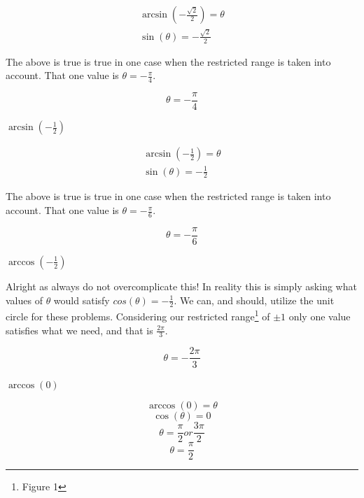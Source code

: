 \documentclass[10pt,letterpaper]{amspset}
\begin{document}
\begin{solution}
    \begin{align}
        \arcsin(-\frac{ \sqrt{2} } {2}) = \theta \\
        \sin(\theta) = -\frac{ \sqrt{2} } {2}
    \end{align}
    
    The above is true is true in one case when the restricted range is taken into account. That one value is $ \theta = -\frac{\pi}{4}$.
    
    \[\boxed{ \theta = -\frac{\pi}{4} }\]
\end{solution}


\begin{problem}[4]
    $\arcsin(-\frac{1}{2})$
\end{problem}

\begin{solution}
    \begin{align}
        \arcsin(-\frac{1}{2}) = \theta \\
        \sin(\theta) = -\frac{1}{2}
    \end{align}
    
    The above is true is true in one case when the restricted range is taken into account. That one value is $ \theta = -\frac{\pi}{6}$.
    
    \[\boxed{ \theta = -\frac{\pi}{6} }\]
\end{solution}

\begin{problem}[13]
    $\arccos(-\frac{1}{2})$
\end{problem}

\begin{solution}
    Alright as always do not overcomplicate this! In reality this is simply asking what values of $\theta$ would satisfy $cos(\theta) = -\frac{1}{2}$. We can, and should, utilize the unit circle for these problems. Considering our restricted range\footnote{Figure 1} of $\pm 1$ only one value satisfies what we need, and that is $\frac{2\pi}{3}$.
    
    \[\boxed{ \theta = -\frac{2\pi}{3} }\]
\end{solution}


\begin{problem}[14]
    $\arccos(0)$
\end{problem}

\begin{solution}
    \[ \arccos(0) = \theta \]
    \[ \cos(\theta) = 0\]
    \[ \theta = \frac{\pi}{2} or \frac{3\pi}{2}\]
    \[ \boxed{ \theta = \frac{\pi}{2} }\]
\end{solution}
\end{document}

